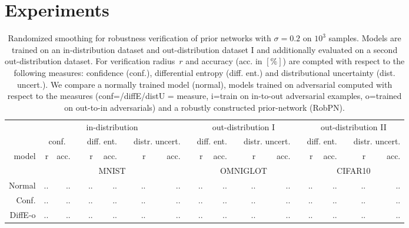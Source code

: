 
\section{Experiments}



\begin{table*}
	\centering
	\caption{Randomized smoothing for robustness verification of prior networks with $\sigma=0.2$ on $10^3$ samples. Models are trained on an in-distribution dataset and out-distribution dataset I and additionally evaluated on a second out-distribution dataset. For verification radius~$r$ and accuracy (acc. in $[\%]$) are compted with respect to the following measures: confidence (conf.), differential entropy (diff. ent.) and distributional uncertainty (dist. uncert.). We compare a normally trained model (normal), models trained on adversarial computed with respect to the measures (conf=/diffE/distU = measure, i=train on in-to-out adversarial examples, o=trained on out-to-in adversarials) and a robustly constructed prior-network (RobPN).}
	\begin{tiny}
		\begin{tabular}{@{}rrrcrrcrrcrrcrrcrrcrr@{}}
			\toprule
			& \multicolumn{8}{c}{in-distribution} &  & \multicolumn{5}{c}{out-distribution I} &   & \multicolumn{5}{c}{out-distribution II} \\
			\cmidrule{2-9} \cmidrule{11-15} \cmidrule{17-21}
			& \multicolumn{2}{c}{conf.} &   & \multicolumn{2}{c}{diff. ent.} &   & \multicolumn{2}{c}{distr. uncert.} &   
			& \multicolumn{2}{c}{diff. ent.} &   & \multicolumn{2}{c}{distr. uncert.} & 
			& \multicolumn{2}{c}{diff. ent.} &   & \multicolumn{2}{c}{distr. uncert.} \\
			\cmidrule{2-3}  \cmidrule{5-6} \cmidrule{8-9} \cmidrule{11-12}  \cmidrule{14-15} \cmidrule{17-18} \cmidrule{20-21}
			model & r & acc. & & r & acc. &  & r & acc. & & r & acc. & & r & acc. & & r & acc. & & r & acc. \\
			\midrule
			& \multicolumn{8}{c}{MNIST} & & \multicolumn{5}{c}{OMNIGLOT} & & \multicolumn{5}{c}{CIFAR10} \\
			Normal     & .. & .. & & .. & .. & & .. & .. & & .. & .. & & .. & .. & & .. & .. & & .. & .. \\
			Conf.      & .. & .. & & .. & .. & & .. & .. & & .. & .. & & .. & .. & & .. & .. & & .. & .. \\
			DiffE-o    & .. & .. & & .. & .. & & .. & .. & & .. & .. & & .. & .. & & .. & .. & & .. & .. \\

\end{tabular}
\end{tiny}
\end{table*}
